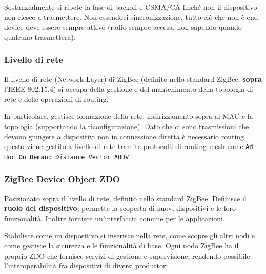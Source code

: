 Sostanzialmente si ripete la fase di backoff e CSMA/CA finché non il dispositivo non riesce a trasmettere. Non essendoci sincronizzazione, tutto ciò che non è end device deve essere sempre attivo (radio sempre accesa, non sapendo quando qualcuno trasmetterà).

\subsubsection{Livello di rete}
Il livello di rete (Network Layer) di ZigBee (definito nello standard ZigBee, \textbf{sopra} l'IEEE 802.15.4) si occupa della gestione e del mantenimento della topologia di rete e delle operazioni di routing. 

In particolare, gestisce formazione della rete, indirizzamento sopra al MAC e la topologia (supportando la riconfigurazione). Dato che ci sono trasmissioni che devono giungere a dispositivi non in connessione diretta è necessario routing, questo viene gestito a livello di rete tramite protocolli di routing mesh come \href{https://en.wikipedia.org/wiki/Ad_hoc_On-Demand_Distance_Vector_Routing}{\texttt{Ad-Hoc On Demand Distance Vector AODV}}.

\subsubsection{ZigBee Device Object ZDO}
Posizionato sopra il livello di rete, definito nello standard ZigBee. Definisce il \textbf{ruolo del dispositivo}, permette la scoperta di nuovi dispositivi e le loro funzionalità. Inoltre fornisce un'interfaccia comune per le applicazioni.

Stabilisce come un dispositivo si inserisce nella rete, come scopre gli altri nodi e come gestisce la sicurezza e le funzionalità di base. Ogni nodo ZigBee ha il proprio ZDO che fornisce servizi di gestione e supervisione, rendendo possibile l’interoperabilità fra dispositivi di diversi produttori. 

